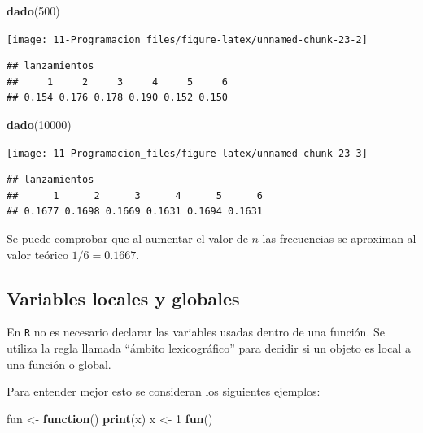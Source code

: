 \documentclass[]{book}
\newenvironment{Shaded}{\begin{snugshade}}{\end{snugshade}}
\newcommand{\KeywordTok}[1]{\textcolor[rgb]{0.13,0.29,0.53}{\textbf{#1}}}
\newcommand{\DecValTok}[1]{\textcolor[rgb]{0.00,0.00,0.81}{#1}}
\newcommand{\StringTok}[1]{\textcolor[rgb]{0.31,0.60,0.02}{#1}}
\newcommand{\ControlFlowTok}[1]{\textcolor[rgb]{0.13,0.29,0.53}{\textbf{#1}}}
\newcommand{\NormalTok}[1]{#1}
\begin{document}
\begin{Shaded}
\begin{Highlighting}[]
\KeywordTok{dado}\NormalTok{(}\DecValTok{500}\NormalTok{)}
\end{Highlighting}
\end{Shaded}

\begin{center}\texttt{[image: 11-Programacion\_files/figure-latex/unnamed-chunk-23-2]} \end{center}

\begin{verbatim}
## lanzamientos
##     1     2     3     4     5     6 
## 0.154 0.176 0.178 0.190 0.152 0.150
\end{verbatim}

\begin{Shaded}
\begin{Highlighting}[]
\KeywordTok{dado}\NormalTok{(}\DecValTok{10000}\NormalTok{)}
\end{Highlighting}
\end{Shaded}

\begin{center}\texttt{[image: 11-Programacion\_files/figure-latex/unnamed-chunk-23-3]} \end{center}

\begin{verbatim}
## lanzamientos
##      1      2      3      4      5      6 
## 0.1677 0.1698 0.1669 0.1631 0.1694 0.1631
\end{verbatim}

Se puede comprobar que al aumentar el valor de \(n\) las frecuencias se
aproximan al valor teórico \(1/6=0.1667\).

\subsection{Variables locales y
globales}\label{variables-locales-y-globales}

En \texttt{R} no es necesario declarar las variables usadas dentro de
una función. Se utiliza la regla llamada ``ámbito lexicográfico'' para
decidir si un objeto es local a una función o global.

Para entender mejor esto se consideran los siguientes ejemplos:

\begin{Shaded}
\begin{Highlighting}[]
\NormalTok{fun <-}\StringTok{ }\ControlFlowTok{function}\NormalTok{() }\KeywordTok{print}\NormalTok{(x)}
\NormalTok{x <-}\StringTok{ }\DecValTok{1}
\KeywordTok{fun}\NormalTok{()}
\end{Highlighting}
\end{Shaded}
\end{document}
